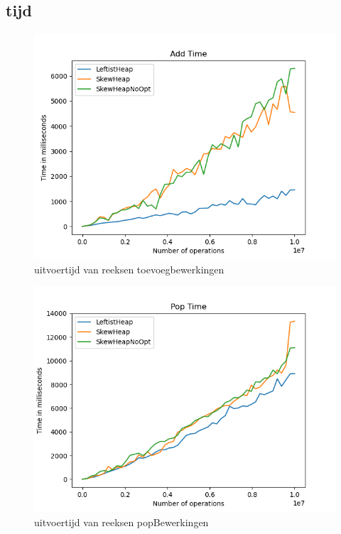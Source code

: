 \documentclass[10pt,a4paper,twoside]{article}
\begin{document}
\subsection{tijd}

\begin{figure}[H]
    \centering
    \includegraphics[width=0.85\linewidth]{graphs/AddTime.png}
    \caption{uitvoertijd van reeksen toevoegbewerkingen}
    \label{fig:addBench}
\end{figure}
\begin{figure}[H]
    \centering
    \includegraphics[width=0.85\linewidth]{graphs/PopTime.png}
    \caption{uitvoertijd van reeksen popBewerkingen}
    \label{fig:popBench}
\end{figure}
\end{document}
